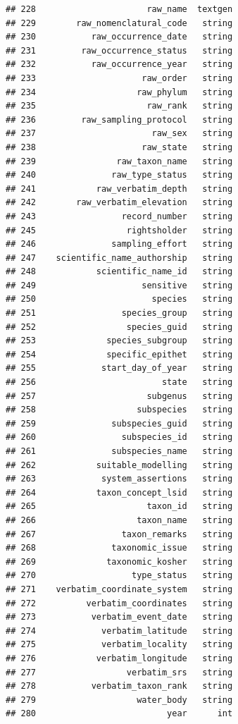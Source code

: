 \documentclass[
  10pt,
]{article}
\begin{document}
\begin{verbatim}
## 228                      raw_name  textgen
## 229        raw_nomenclatural_code   string
## 230           raw_occurrence_date   string
## 231         raw_occurrence_status   string
## 232           raw_occurrence_year   string
## 233                     raw_order   string
## 234                    raw_phylum   string
## 235                      raw_rank   string
## 236         raw_sampling_protocol   string
## 237                       raw_sex   string
## 238                     raw_state   string
## 239                raw_taxon_name   string
## 240               raw_type_status   string
## 241            raw_verbatim_depth   string
## 242        raw_verbatim_elevation   string
## 243                 record_number   string
## 245                  rightsholder   string
## 246               sampling_effort   string
## 247    scientific_name_authorship   string
## 248            scientific_name_id   string
## 249                     sensitive   string
## 250                       species   string
## 251                 species_group   string
## 252                  species_guid   string
## 253              species_subgroup   string
## 254              specific_epithet   string
## 255             start_day_of_year   string
## 256                         state   string
## 257                      subgenus   string
## 258                    subspecies   string
## 259               subspecies_guid   string
## 260                 subspecies_id   string
## 261               subspecies_name   string
## 262            suitable_modelling   string
## 263             system_assertions   string
## 264            taxon_concept_lsid   string
## 265                      taxon_id   string
## 266                    taxon_name   string
## 267                 taxon_remarks   string
## 268               taxonomic_issue   string
## 269              taxonomic_kosher   string
## 270                   type_status   string
## 271    verbatim_coordinate_system   string
## 272          verbatim_coordinates   string
## 273           verbatim_event_date   string
## 274             verbatim_latitude   string
## 275             verbatim_locality   string
## 276            verbatim_longitude   string
## 277                  verbatim_srs   string
## 278           verbatim_taxon_rank   string
## 279                    water_body   string
## 280                          year      int
\end{verbatim}
\end{document}
